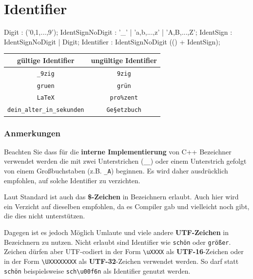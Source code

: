 \documentclass[a4paper]{report}
\begin{document}
\section{Identifier}


\begin{multicols}{2}
	\begin{rail}
		Digit : ('0,1,...,9');
		IdentSignNoDigit : '\_' | 'a,b,...,z' | 'A,B,...,Z';
		IdentSign : IdentSignNoDigit | Digit;
		Identifier : IdentSignNoDigit (() + IdentSign);
	\end{rail}
	\vspace{1ex}
	\begin{center}
		\begin{tabular}{|c|c|}
			\hline
			\textbf{gültige Identifier} & \textbf{ungültige Identifier} \\ \hline
			\texttt{\_9zig} & \texttt{9zig} \\
			\texttt{gruen} & \texttt{grün} \\
			\texttt{LaTeX} & \texttt{pro\%zent} \\
			\texttt{dein\_alter\_in\_sekunden} & \texttt{Ge\textrm{§}etzbuch} \\
			\hline
		\end{tabular}
	\end{center}
	
	\subsubsection{Anmerkungen}
	Beachten Sie dass für die \textbf{interne Implementierung} von C++ Bezeichner verwendet werden die mit zwei Unterstrichen (\texttt{\_\_}) oder einem Unterstrich gefolgt von einem Großbuchstaben (z.B. \texttt{\_A}) beginnen. Es wird daher ausdrücklich empfohlen, auf solche Identifier zu verzichten.
	
	Laut Standard ist auch das \textbf{\$-Zeichen} in Bezeichnern erlaubt. Auch hier wird ein Verzicht auf dieselben empfohlen, da es Compiler gab und vielleicht noch gibt, die dies nicht unterstützen.
	
	Dagegen ist es jedoch Möglich Umlaute und viele andere \textbf{UTF-Zeichen} in Bezeichnern zu nutzen. Nicht erlaubt sind Identifier wie \texttt{schön} oder \texttt{größer}. Zeichen dürfen aber UTF-codiert in der Form \texttt{\textrm{\textbackslash}uXXXX} als \textbf{UTF-16}-Zeichen oder in der Form \texttt{\textrm{\textbackslash}UXXXXXXXX} als \textbf{UTF-32}-Zeichen verwendet werden. So darf statt \texttt{schön} beispielsweise \texttt{sch\textrm{\textbackslash}u00f6n} als Identifier genutzt werden.
\end{multicols}
\end{document}
